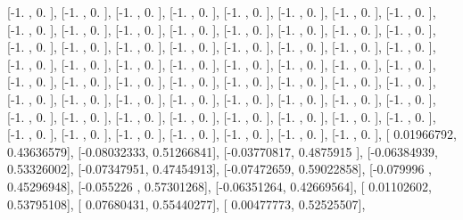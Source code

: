 \documentclass{article}
\begin{document}
       [-1.        ,  0.        ],
       [-1.        ,  0.        ],
       [-1.        ,  0.        ],
       [-1.        ,  0.        ],
       [-1.        ,  0.        ],
       [-1.        ,  0.        ],
       [-1.        ,  0.        ],
       [-1.        ,  0.        ],
       [-1.        ,  0.        ],
       [-1.        ,  0.        ],
       [-1.        ,  0.        ],
       [-1.        ,  0.        ],
       [-1.        ,  0.        ],
       [-1.        ,  0.        ],
       [-1.        ,  0.        ],
       [-1.        ,  0.        ],
       [-1.        ,  0.        ],
       [-1.        ,  0.        ],
       [-1.        ,  0.        ],
       [-1.        ,  0.        ],
       [-1.        ,  0.        ],
       [-1.        ,  0.        ],
       [-1.        ,  0.        ],
       [-1.        ,  0.        ],
       [-1.        ,  0.        ],
       [-1.        ,  0.        ],
       [-1.        ,  0.        ],
       [-1.        ,  0.        ],
       [-1.        ,  0.        ],
       [-1.        ,  0.        ],
       [-1.        ,  0.        ],
       [-1.        ,  0.        ],
       [-1.        ,  0.        ],
       [-1.        ,  0.        ],
       [-1.        ,  0.        ],
       [-1.        ,  0.        ],
       [-1.        ,  0.        ],
       [-1.        ,  0.        ],
       [-1.        ,  0.        ],
       [-1.        ,  0.        ],
       [-1.        ,  0.        ],
       [-1.        ,  0.        ],
       [-1.        ,  0.        ],
       [-1.        ,  0.        ],
       [-1.        ,  0.        ],
       [-1.        ,  0.        ],
       [-1.        ,  0.        ],
       [-1.        ,  0.        ],
       [-1.        ,  0.        ],
       [-1.        ,  0.        ],
       [-1.        ,  0.        ],
       [-1.        ,  0.        ],
       [-1.        ,  0.        ],
       [-1.        ,  0.        ],
       [-1.        ,  0.        ],
       [-1.        ,  0.        ],
       [-1.        ,  0.        ],
       [-1.        ,  0.        ],
       [-1.        ,  0.        ],
       [-1.        ,  0.        ],
       [-1.        ,  0.        ],
       [-1.        ,  0.        ],
       [-1.        ,  0.        ],
       [ 0.01966792,  0.43636579],
       [-0.08032333,  0.51266841],
       [-0.03770817,  0.4875915 ],
       [-0.06384939,  0.53326002],
       [-0.07347951,  0.47454913],
       [-0.07472659,  0.59022858],
       [-0.079996  ,  0.45296948],
       [-0.055226  ,  0.57301268],
       [-0.06351264,  0.42669564],
       [ 0.01102602,  0.53795108],
       [ 0.07680431,  0.55440277],
       [ 0.00477773,  0.52525507],
\end{document}
